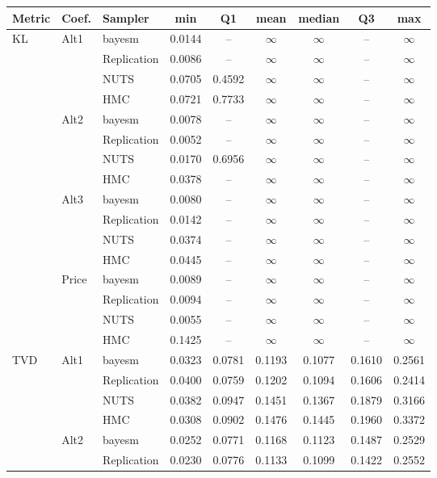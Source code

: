 \begin{tabular}{lllcccccc}
\toprule
Metric & Coef. & Sampler & min & Q1 & mean & median & Q3 & max \\
\midrule
KL & Alt1 & bayesm & 0.0144 & {--} & $\infty$ & $\infty$ & {--} & $\infty$ \\
 &  & Replication & 0.0086 & {--} & $\infty$ & $\infty$ & {--} & $\infty$ \\
 &  & NUTS & 0.0705 & 0.4592 & $\infty$ & $\infty$ & {--} & $\infty$ \\
 &  & HMC & 0.0721 & 0.7733 & $\infty$ & $\infty$ & {--} & $\infty$ \\
 & Alt2 & bayesm & 0.0078 & {--} & $\infty$ & $\infty$ & {--} & $\infty$ \\
 &  & Replication & 0.0052 & {--} & $\infty$ & $\infty$ & {--} & $\infty$ \\
 &  & NUTS & 0.0170 & 0.6956 & $\infty$ & $\infty$ & {--} & $\infty$ \\
 &  & HMC & 0.0378 & {--} & $\infty$ & $\infty$ & {--} & $\infty$ \\
 & Alt3 & bayesm & 0.0080 & {--} & $\infty$ & $\infty$ & {--} & $\infty$ \\
 &  & Replication & 0.0142 & {--} & $\infty$ & $\infty$ & {--} & $\infty$ \\
 &  & NUTS & 0.0374 & {--} & $\infty$ & $\infty$ & {--} & $\infty$ \\
 &  & HMC & 0.0445 & {--} & $\infty$ & $\infty$ & {--} & $\infty$ \\
 & Price & bayesm & 0.0089 & {--} & $\infty$ & $\infty$ & {--} & $\infty$ \\
 &  & Replication & 0.0094 & {--} & $\infty$ & $\infty$ & {--} & $\infty$ \\
 &  & NUTS & 0.0055 & {--} & $\infty$ & $\infty$ & {--} & $\infty$ \\
 &  & HMC & 0.1425 & {--} & $\infty$ & $\infty$ & {--} & $\infty$ \\
TVD & Alt1 & bayesm & 0.0323 & 0.0781 & 0.1193 & 0.1077 & 0.1610 & 0.2561 \\
 &  & Replication & 0.0400 & 0.0759 & 0.1202 & 0.1094 & 0.1606 & 0.2414 \\
 &  & NUTS & 0.0382 & 0.0947 & 0.1451 & 0.1367 & 0.1879 & 0.3166 \\
 &  & HMC & 0.0308 & 0.0902 & 0.1476 & 0.1445 & 0.1960 & 0.3372 \\
 & Alt2 & bayesm & 0.0252 & 0.0771 & 0.1168 & 0.1123 & 0.1487 & 0.2529 \\
 &  & Replication & 0.0230 & 0.0776 & 0.1133 & 0.1099 & 0.1422 & 0.2552 \\

\end{tabular}
